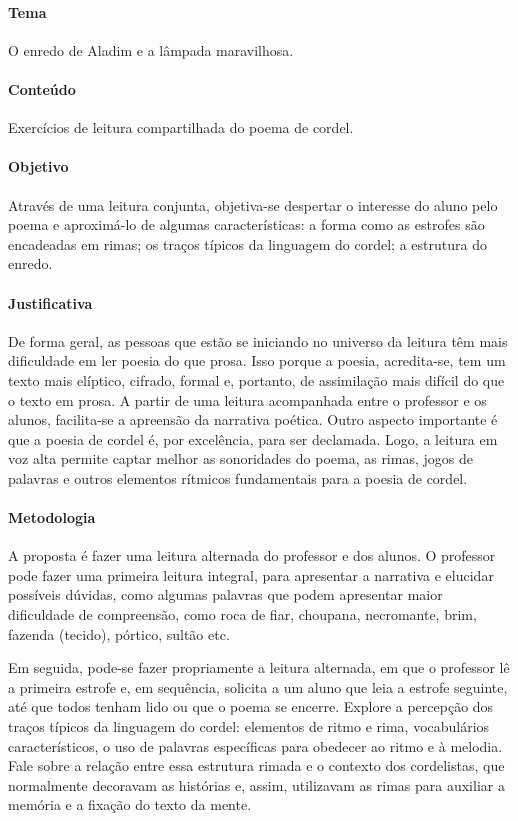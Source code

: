 \documentclass[11pt]{extarticle}
\begin{document}
\paragraph{Tema} O enredo de Aladim e a lâmpada maravilhosa.

\paragraph{Conteúdo} Exercícios de leitura compartilhada do poema de cordel.

\paragraph{Objetivo} Através de uma leitura conjunta, objetiva-se despertar o interesse do aluno pelo poema e aproximá-lo de algumas características: a forma como as estrofes são encadeadas em rimas; os traços típicos da linguagem do cordel; a estrutura do enredo.

\paragraph{Justificativa} De forma geral, as pessoas que estão se iniciando no universo da leitura têm mais dificuldade em ler poesia do que prosa. Isso porque a poesia, acredita-se, tem um texto mais elíptico, cifrado, formal e, portanto, de assimilação mais difícil do que o texto em prosa. A partir de uma leitura acompanhada entre o professor e os alunos, facilita-se a apreensão da narrativa poética. Outro aspecto importante é que a poesia de cordel é, por excelência, para ser declamada. Logo, a leitura em voz alta permite captar melhor as sonoridades do poema, as rimas, jogos de palavras e outros elementos rítmicos fundamentais para a poesia de cordel.

\paragraph{Metodologia} A proposta é fazer uma leitura alternada do professor e dos alunos. O professor pode fazer uma primeira leitura integral, para apresentar a narrativa e elucidar possíveis dúvidas, como algumas palavras que podem apresentar maior dificuldade de compreensão, como roca de fiar, choupana, necromante, brim, fazenda (tecido), pórtico, sultão etc. 

Em seguida, pode-se fazer propriamente a leitura alternada, em que o professor lê a primeira estrofe e, em sequência, solicita a um aluno que leia a estrofe seguinte, até que todos tenham lido ou que o poema se encerre.
Explore a percepção dos traços típicos da linguagem do cordel: elementos de ritmo e rima, vocabulários característicos, o uso de palavras específicas para obedecer ao ritmo e à melodia. Fale sobre a relação entre essa estrutura rimada e o contexto dos cordelistas, que normalmente decoravam as histórias e, assim, utilizavam as rimas para auxiliar a memória e a fixação do texto da mente.
\end{document}
